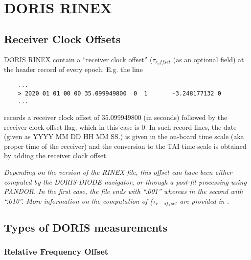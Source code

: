 \chapter{DORIS RINEX}
\label{ch:doris-rinex}

\section{Receiver Clock Offsets}

DORIS RINEX contain a ``receiver clock offset'' (\(\tau_{r_offset}\) (as an optional 
field) at the header record of every epoch. E.g. the line
\begin{verbatim}
    ...
    > 2020 01 01 00 00 35.099949800  0  1       -3.248177132 0
    ...
\end{verbatim}
records a receiver clock offset of 35.099949800 (in seconds) followed by the receiver 
clock offset flag, which in this case is 0. In such record lines, the date (given 
as YYYY MM DD HH MM SS.) is given in the on-board time scale (aka proper time of 
the receiver) and the conversion to the TAI time scale is obtained by adding the 
receiver clock offset.

\textit{Depending on the version of the RINEX file, this offset can have been either 
computed by the DORIS-DIODE navigator, or through a post-fit processing using PANDOR. 
In the first case, the file ends with ``.001'' whereas in the second with ``.010''. 
More information on the computation of (\(\tau_{r-offset}\) are provided in \cite{lemoine-2016}.}

\section{Types of DORIS measurements}
\label{sec:types-of-doris-measurements}

\subsection{Relative Frequency Offset}
\label{ssec:relative-frequency-offset}

